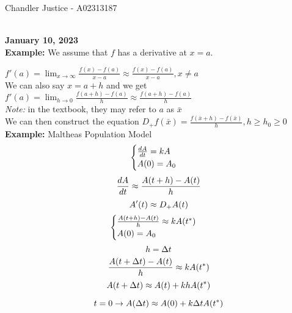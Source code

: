 \documentclass[10pt, AMS Euler]{article}
\begin{document}
\begin{flushright}
Chandler Justice - A02313187
\end{flushright}
\noindent \underline{\hspace{3in}}\\

\textbf{January 10, 2023}\\

\textbf{Example:} We assume that $f$ has a derivative at $x = a$.

$f'(a) = \lim_{x\to\infty} \frac{f(x) - f(a)}{x - a} \approx \frac{f(x) - f(a)}{x - a}, x \neq a$\\

We can also say $x = a + h$ and we get $f'(a) = \lim_{h \to 0} \frac{f(a + h) - f(a)}{h} \approx \frac{f(a + h) - f(a)}{h}$\\

\textit{Note:} in the textbook, they may refer to $a$ as $\bar{x}$\\

We can then construct the equation $D_+ f(\bar{x}) = \frac{f(\bar{x} + h) - f(\bar{x})}{h}, h \geq h_0 \geq 0$\\

\textbf{Example:} Maltheas Population Model\\

\[ 
    \begin{cases}
        \frac{dA}{dt} = kA\\
        A(0) = A_0\\
    \end{cases}\\
\]    
\[    
    \frac{dA}{dt} \approx \frac{A(t + h) - A(t)}{h}\\
\]
\[
    A'(t) \approx D_+ A(t)\\
\]   
    \[   
    \begin{cases}
        \frac{A(t + h) - A(t)}{h} \approx kA(t^*)\\
        A(0) = A_0
    \end{cases}\\
\] 
\[   
    h = \Delta t\\
\]    
\[
    \frac{A(t + \Delta t) - A(t)}{h} \approx kA(t^*)\\
\]    
\[    A(t + \Delta t) \approx A(t) + k h A(t^*)\\ \]
    
\[    t = 0 \rightarrow A(\Delta t) \approx A(0) + k \Delta t A(t^*)\\ \]
    
\end{document}
